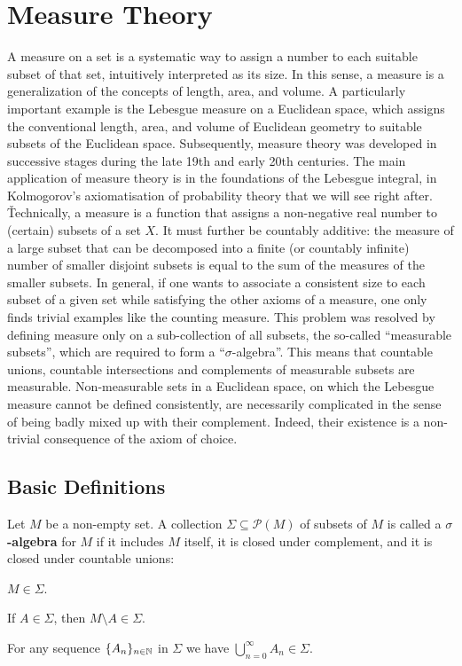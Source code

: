 \section{Measure Theory}

A measure on a set is a systematic way to assign a number to each suitable subset of that set, intuitively 
interpreted as its size. In this sense, a measure is a generalization of the concepts of length, area, and volume. 
A particularly important example is the Lebesgue measure on a Euclidean space, which assigns the conventional 
length, area, and volume of Euclidean geometry to suitable subsets of the Euclidean space. Subsequently, measure 
theory was developed in successive stages during the late 19th and early 20th centuries. The main application of 
measure theory is in the foundations of the Lebesgue integral, in Kolmogorov's axiomatisation of probability theory 
that we will see right after. \v

Technically, a measure is a function that assigns a non-negative real number to (certain) subsets of a set $X$. It
must further be countably additive: the measure of a large subset that can be decomposed into a finite (or countably
infinite) number of smaller disjoint subsets is equal to the sum of the measures of the smaller subsets. In general,
if one wants to associate a consistent size to each subset of a given set while satisfying the other axioms of a
measure, one only finds trivial examples like the counting measure. This problem was resolved by defining measure
only on a sub-collection of all subsets, the so-called ``measurable subsets'', which are required to form a
``$\sigma$-algebra''. This means that countable unions, countable intersections and complements of measurable subsets
are measurable. Non-measurable sets in a Euclidean space, on which the Lebesgue measure cannot be defined
consistently, are necessarily complicated in the sense of being badly mixed up with their complement. Indeed, their
existence is a non-trivial consequence of the axiom of choice.

\subsection{Basic Definitions}

 Let $M$ be a non-empty set. A collection $\Sigma\subseteq\mathscr{P}(M)$ of subsets of $M$ is
called a \textbf{$\sigma$-algebra} for $M$ if it includes $M$ itself, it is closed under complement, and it is closed
under countable unions:
\ben[label=(\roman*)]
\item $M\in \Sigma$.
\item If $A\in \Sigma$, then $M\setminus A \in \Sigma$.
\item For any sequence $\{A_n\}_{n\in \mathbb{N}}$ in $\Sigma$ we have $\bigcup_{n=0}^{\infty}A_n\in\Sigma$.
\een
\ed

